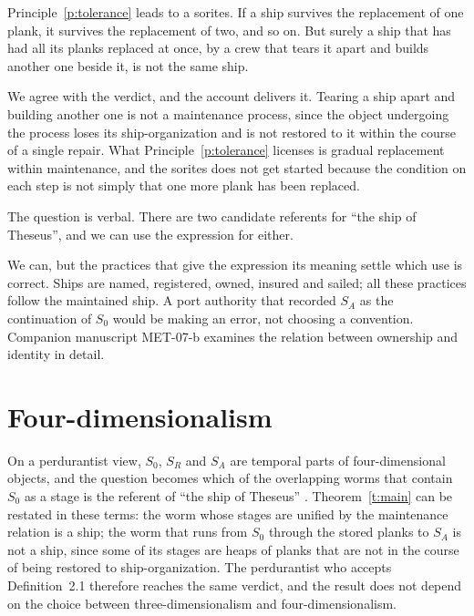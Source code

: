 \documentclass{situationist-preprint}
\begin{document}
\begin{objection}
Principle~\ref{p:tolerance} leads to a sorites. If a ship survives the replacement of one plank, it survives the replacement of two, and so on. But surely a ship that has had all its planks replaced at once, by a crew that tears it apart and builds another one beside it, is not the same ship.
\end{objection}

\begin{reply}
We agree with the verdict, and the account delivers it. Tearing a ship apart and building another one is not a maintenance process, since the object undergoing the process loses its ship-organization and is not restored to it within the course of a single repair. What Principle~\ref{p:tolerance} licenses is gradual replacement within maintenance, and the sorites does not get started because the condition on each step is not simply that one more plank has been replaced.
\end{reply}

\begin{objection}
The question is verbal. There are two candidate referents for \enquote{the ship of Theseus}, and we can use the expression for either.
\end{objection}

\begin{reply}
We can, but the practices that give the expression its meaning settle which use is correct. Ships are named, registered, owned, insured and sailed; all these practices follow the maintained ship. A port authority that recorded $S_A$ as the continuation of $S_0$ would be making an error, not choosing a convention. Companion manuscript MET-07-b examines the relation between ownership and identity in detail.
\end{reply}

\section{Four-dimensionalism}

On a perdurantist view, $S_0$, $S_R$ and $S_A$ are temporal parts of four-dimensional objects, and the question becomes which of the overlapping worms that contain $S_0$ as a stage is the referent of \enquote{the ship of Theseus} \citep{Lewis1976,Sider2001}. Theorem~\ref{t:main} can be restated in these terms: the worm whose stages are unified by the maintenance relation is a ship; the worm that runs from $S_0$ through the stored planks to $S_A$ is not a ship, since some of its stages are heaps of planks that are not in the course of being restored to ship-organization. The perdurantist who accepts Definition~2.1 therefore reaches the same verdict, and the result does not depend on the choice between three-dimensionalism and four-dimensionalism.
\end{document}
